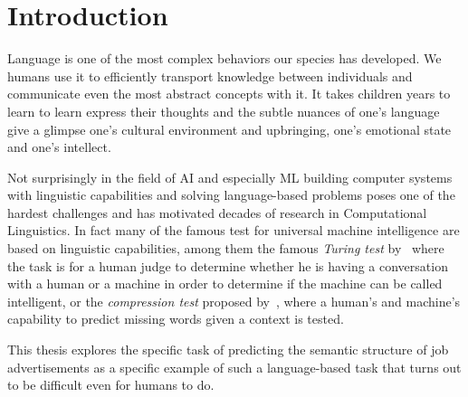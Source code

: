 
\thispagestyle{empty}


\section{Introduction}

Language is one of the most complex behaviors our species has developed. We humans use it to efficiently transport knowledge between individuals and communicate even the most abstract concepts with it. It takes children years to learn to learn express their thoughts and the subtle nuances of one's language give a glimpse one's cultural environment and upbringing, one's emotional state and one's intellect.

Not surprisingly in the field of \gls{AI} and especially \gls{ML} building computer systems with linguistic capabilities and solving language-based problems poses one of the hardest challenges and has motivated decades of research in Computational Linguistics. In fact many of the famous test for universal machine intelligence are based on linguistic capabilities, among them the famous \emph{Turing test} by~\cite{Turing:1950aa} where the task is for a human judge to determine whether he is having a conversation with a human or a machine in order to determine if the machine can be called intelligent, or the \emph{compression test} proposed by~\cite{Mahoney:1999aa}, where a human's and machine's capability to predict missing words given a context is tested.

This thesis explores the specific task of predicting the semantic structure of job advertisements as a specific example of such a language-based task that turns out to be difficult even for humans to do.

%


